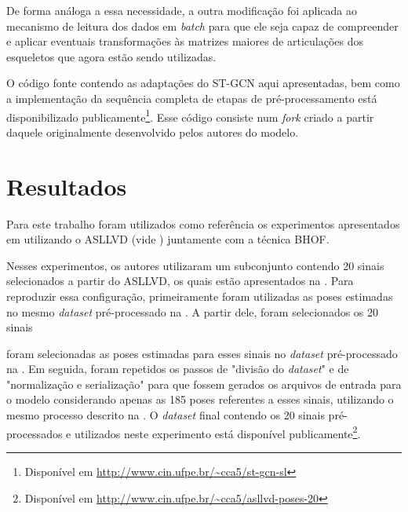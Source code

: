 De forma análoga a essa necessidade, a outra modificação foi aplicada ao mecanismo de leitura dos dados em \textit{batch} para que ele seja capaz de compreender e aplicar eventuais transformações às matrizes maiores de articulações dos esqueletos que agora estão sendo utilizadas. 

O código fonte contendo as adaptações do ST-GCN aqui apresentadas, bem como a implementação da sequência completa de etapas de pré-processamento está disponibilizado publicamente\footnote{
    Disponível em \url{http://www.cin.ufpe.br/~cca5/st-gcn-sl}
}. Esse código consiste num \textit{fork} criado a partir daquele originalmente desenvolvido pelos autores do modelo.


\section{Resultados} %
\label{sec:resultados}



Para este trabalho foram utilizados como referência os experimentos apresentados em \cite{lim-2016} utilizando o ASLLVD (vide ) juntamente com a técnica BHOF. 

Nesses experimentos, os autores utilizaram um subconjunto contendo 20 sinais selecionados a partir do ASLLVD, os quais estão apresentados na . Para reproduzir essa configuração, primeiramente foram utilizadas as poses estimadas no mesmo \textit{dataset} pré-processado na . A partir dele, foram selecionados os 20 sinais

foram selecionadas as poses estimadas para esses sinais no \textit{dataset} pré-processado na . Em seguida, foram repetidos os passos de "divisão do \textit{dataset}" e de "normalização e serialização" para que fossem gerados os arquivos de entrada para o modelo considerando apenas as 185 poses referentes a esses sinais, utilizando o mesmo processo descrito na . O \textit{dataset} final contendo os 20 sinais pré-processados e utilizados neste experimento está disponível publicamente\footnote{
    Disponível em \url{http://www.cin.ufpe.br/~cca5/asllvd-poses-20}
}.

